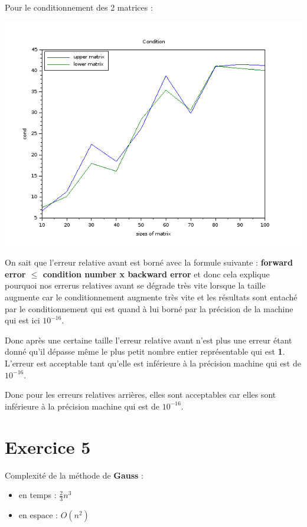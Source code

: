 \documentclass{article}
\begin{document}
Pour le conditionnement des 2 matrices :

\includegraphics[scale=0.5]{img/condb.png}

On sait que l'erreur relative avant est borné avec la formule suivante
: \textbf{forward error $\le$ condition number x backward error} et
donc cela explique pourquoi nos errerus relatives avant se
dégrade très vite lorsque la taille augmente car le conditionnement
augmente très vite et les résultats sont entaché par le
conditionnement qui est quand à lui borné par la précision de la
machine qui est ici $10^{-16}$. \newline

Donc après une certaine taille l'erreur relative avant n'est plus une
erreur étant donné qu'il dépasse même le plus petit nombre entier
représentable qui est \textbf{1}. L'erreur est acceptable tant qu'elle
est inférieure à la précision machine qui est de $10^{-16}$. \newline

Donc pour les erreurs relatives arrières, elles sont acceptables car
elles sont inférieure à la précision machine qui est de
$10^{-16}$. \newline

\section*{Exercice 5}

Complexité de la méthode de \textbf{Gauss} :

\begin{itemize}
\item en temps  : $\frac{2}{3} n^3$
\item en espace : $O(n^2)$
\end{itemize}
\end{document}

